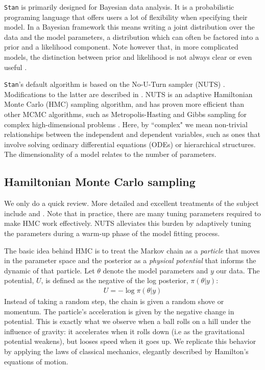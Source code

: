 \documentclass[11pt]{article}
\begin{document}
  \texttt{Stan} is primarily designed for Bayesian data analysis.
  It is a probabilistic programing language that offers users a lot of flexibility
  when specifying their model. In a Bayesian framework this means writing
  a joint distribution over the data and the model parameters,
  a distribution which can often be factored into a prior and a likelihood component.
  Note however that, in more complicated models, the distinction between prior and likelihood
  is not always clear or even useful \cite{Gelman:2017}.

  \texttt{Stan}'s default algorithm is based on the No-U-Turn sampler
  (NUTS) \cite{Hoffman:2014}. Modifications to the latter are described in \cite{Betancourt:2017}.
  NUTS is an adaptive Hamiltonian Monte Carlo (HMC) sampling algorithm,
  and has proven more efficient than other MCMC algorithms,
  such as Metropolis-Hasting and Gibbs sampling for complex high-dimensional problems
  \cite{Hoffman:2014}.
  Here, by ``complex" we mean non-trivial relationships between the independent and dependent
  variables, such as ones that involve solving ordinary differential equations (ODEs) or hierarchical structures. 
  The dimensionality of a model relates to the number of parameters.
  
  
  \subsection{Hamiltonian Monte Carlo sampling}
  
  We only do a quick review. More detailed and excellent treatments of the subject 
  include \cite{Betancourt:2017} and  \cite{Radford:2010}.
  Note that in practice, there are many tuning parameters required to make HMC work effectively.
  NUTS alleviates this burden by adaptively tuning the parameters during a warm-up phase of the
  model fitting process.
    
  The basic idea behind HMC is to treat the Markov chain as a \textit{particle} that moves in the
  parameter space and the posterior as a \textit{physical potential} that informs the dynamic of
  that particle. Let $\theta$ denote the model parameters and $y$ our data.
  The potential, $U$, is defined as the negative of the log posterior, $\pi(\theta | y)$:
  \begin{eqnarray}
    U = - \log \pi(\theta | y)
  \label{eq:potential}
  \end{eqnarray}
  Instead of taking a random step, the chain is given a random shove or momentum. The
  particle's acceleration is given by the negative change in potential. This is exactly what 
  we observe when a ball rolls on a hill under the influence of gravity: it accelerates when
  it rolls down (i.e as the gravitational potential weakens), but looses speed when it goes
  up. We replicate this behavior by applying the laws of classical mechanics, elegantly 
  described by Hamilton's equations of motion.
  
\end{document}
